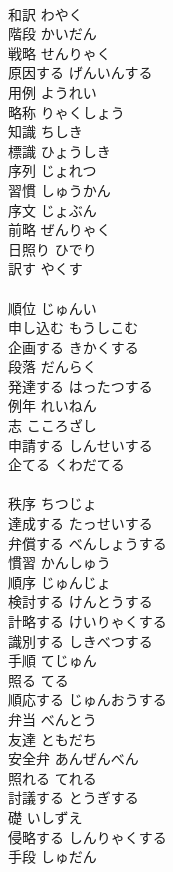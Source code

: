 \documentclass[8pt]{extreport}
\begin{document}
\begin{CJK}{UTF8}{min}
\\	和訳	わやく	
\\	階段	かいだん	
\\	戦略	せんりゃく	
\\	原因する	げんいんする	
\\	用例	ようれい	
\\	略称	りゃくしょう	
\\	知識	ちしき	
\\	標識	ひょうしき	
\\	序列	じょれつ	
\\	習慣	しゅうかん	
\\	序文	じょぶん	
\\	前略	ぜんりゃく	
\\	日照り	ひでり	
\\	訳す	やくす	
\\	[和語]
\\	順位	じゅんい	
\\	申し込む	もうしこむ	
\\	企画する	きかくする	
\\	段落	だんらく	
\\	発達する	はったつする	
\\	例年	れいねん	
\\	志	こころざし	
\\	申請する	しんせいする	
\\	企てる	くわだてる	
\\	[和語]
\\	秩序	ちつじょ	
\\	達成する	たっせいする	
\\	弁償する	べんしょうする	
\\	慣習	かんしゅう	
\\	順序	じゅんじょ	
\\	検討する	けんとうする	
\\	計略する	けいりゃくする	
\\	識別する	しきべつする	
\\	手順	てじゅん	
\\	照る	てる	
\\	順応する	じゅんおうする	
\\	弁当	べんとう	
\\	友達	ともだち	
\\	安全弁	あんぜんべん	
\\	照れる	てれる	
\\	討議する	とうぎする	
\\	礎	いしずえ	
\\	侵略する	しんりゃくする	
\\	手段	しゅだん	

\end{CJK}
\end{document}
